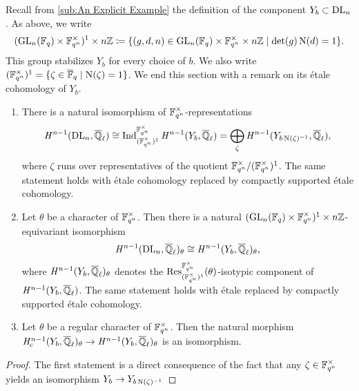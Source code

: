 \documentclass[../main.tex]{subfiles}
\begin{document}
Recall from \cref{sub:An Explicit Example} the definition
of the component $Y_b \subset \mathrm{DL}_n$. As above, we write
\begin{equation*}
  (\operatorname{GL}_n(\mathbb{F}_q) \times \mathbb{F}_{q^n}^\times)^1 \times n\mathbb{Z} 
  \coloneq \{(g,d,n) \in \operatorname{GL}_n(\mathbb{F}_q) \times \mathbb{F}_{q^n}^\times \times n\mathbb{Z} 
  \mid \det(g) \operatorname{N}(d) = 1\}.
\end{equation*}
This group stabilizes $Y_b$ for every choice of $b$. 
We also write $(\mathbb{F}_{q^n}^\times)^1 = \{\zeta \in {\overline{\mathbb{F}}_q} \mid \operatorname{N}(\zeta) =
1\}$. We end this section with a remark on its \'etale cohomology of $Y_b$.

\begin{lem}\label{lem:ResultsAboutYb}\leavevmode
  \begin{enumerate}
    \item There is a natural isomorphism of $\mathbb{F}_{q^n}^\times$-representations
      \begin{equation*}
         \mathit H^{n-1}(\mathrm{DL}_n, {\overline {\mathbb{Q}}_\ell}) \cong
         \operatorname{Ind}_{(\mathbb{F}_{q^n}^\times)^1}^{\mathbb{F}_{q^n}^\times}\mathit H^{n-1}(Y_b,
         {\overline {\mathbb{Q}}_\ell}) = \bigoplus_{\zeta} \mathit H^{n-1}(Y_{b
         \operatorname{N}(\zeta)^{-1}}, {\overline {\mathbb{Q}}_\ell}),
      \end{equation*}
      where $\zeta$ runs over representatives of the quotient
      $\mathbb{F}_{q^n}^\times/(\mathbb{F}_{q^n}^\times)^1$. The same statement holds with \'etale cohomology replaced by
      compactly supported \'etale cohomology.
    \item Let $\theta$ be a character of $\mathbb{F}_{q^n}^\times$.
      Then there is a natural $(\operatorname{GL}_n(\mathbb{F}_q) \times
      \mathbb{F}_{q^n}^\times)^1 \times n\mathbb{Z}$-equivariant isomorphism 
      \begin{equation*}
        \mathit H^{n-1}(\mathrm{DL}_n, {\overline {\mathbb{Q}}_\ell})_\theta \cong 
        \mathit H^{n-1}(Y_b, {\overline {\mathbb{Q}}_\ell})_\theta,
      \end{equation*}
      where $\mathit H^{n-1}(Y_b, {\overline {\mathbb{Q}}_\ell})_\theta$ denotes the
      $\operatorname{Res}_{(\mathbb{F}_{q^n}^\times)^1}^{\mathbb{F}_{q^n}^\times} (\theta)$-isotypic component of
      $\mathit H^{n-1}(Y_b, {\overline {\mathbb{Q}}_\ell})$.
      The same statement holds with \'etale replaced by compactly supported
      \'etale cohomology.
    \item Let $\theta$ be a regular character of $\mathbb{F}_{q^n}^\times$. Then the natural morphism $\mathit H_{\mathrm{c}}^{n-1}(Y_b, {\overline {\mathbb{Q}}_\ell})_\theta \to \mathit H^{n-1}(Y_b,
      {\overline {\mathbb{Q}}_\ell})_\theta$
      is an isomorphism.
  \end{enumerate}
\begin{proof}
  The first statement is a direct consequence of the fact that any $\zeta \in
  \mathbb{F}_{q^n}^{\times}$ yields an isomorphism $Y_b \to Y_{b \operatorname{N}(\zeta)^{-1}}$

\end{proof}
\end{lem}
\end{document}
